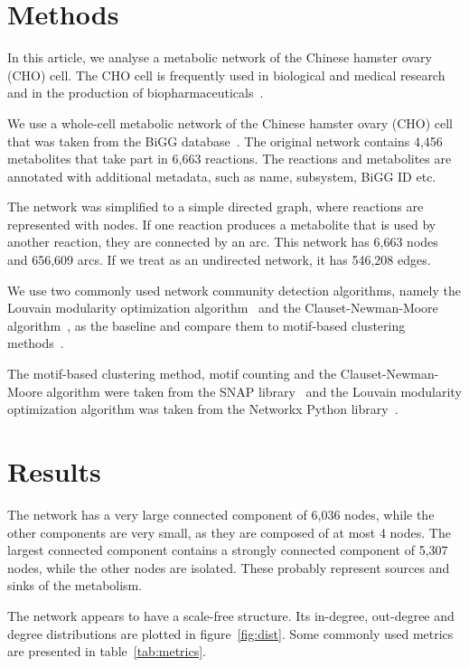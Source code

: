 \section{Methods}
\label{sec:methods}

In this article, we analyse a metabolic network of the Chinese hamster
ovary (CHO) cell. The CHO cell is frequently used in biological and medical
research and in the production of biopharmaceuticals~\cite{chocons}.

We use a whole-cell metabolic network of the Chinese hamster ovary (CHO)
cell that was taken from the BiGG database~\cite{bigg,chocons}. The original
network contains 4,456 metabolites that take part in 6,663 reactions. The
reactions and metabolites are annotated with additional metadata, such as name,
subsystem, BiGG ID etc.

The network was simplified to a simple directed graph, where reactions are
represented with nodes. If one reaction produces a metabolite that is used by
another reaction, they are connected by an arc. This network has 6,663 nodes and
656,609 arcs. If we treat as an undirected network, it has 546,208 edges.

We use two commonly used network community detection algorithms, namely the
Louvain modularity optimization algorithm~\cite{blondel2008fast} and the
Clauset-Newman-Moore algorithm~\cite{clauset2004finding}, as the baseline and
compare them to motif-based clustering methods~\cite{benson2016higher}.

The motif-based clustering method, motif counting and the Clauset-Newman-Moore
algorithm were taken from the SNAP library~\cite{leskovec2016snap} and the
Louvain modularity optimization algorithm was taken from the Networkx Python
library~\cite{networkx}.

\section{Results}
\label{sec:results}

The network has a very large connected component of 6,036 nodes, while the other
components are very small, as they are composed of at most 4 nodes. The largest
connected component contains a strongly connected component of 5,307 nodes,
while the other nodes are isolated. These probably represent sources and sinks
of the metabolism.

The network appears to have a scale-free structure. Its in-degree, out-degree
and degree distributions are plotted in figure~\ref{fig:dist}. Some commonly
used metrics are presented in table~\ref{tab:metrics}.

